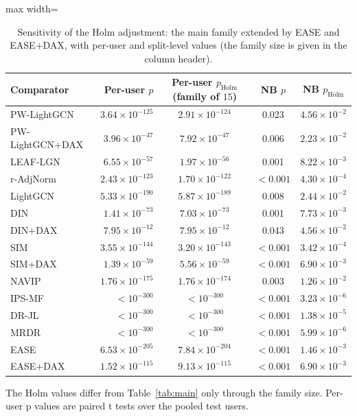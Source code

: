 \documentclass[preprint,12pt,authoryear]{elsarticle}
\begin{document}
\begin{table}[tbp]
\centering
\footnotesize
\caption{Sensitivity of the Holm adjustment: the main family extended by EASE and EASE+DAX, with per-user and split-level values (the family size is given in the column header).}
\label{tab:sens}
\begin{adjustbox}{max width=\linewidth}
\begin{tabular}{lrccc}
\toprule
Comparator & Per-user $p$ & Per-user $p_{\mathrm{Holm}}$ (family of $15$) & NB $p$ & NB $p_{\mathrm{Holm}}$ \\
\midrule
PW-LightGCN & $3.64\times10^{-125}$ & $2.91\times10^{-124}$ & 0.023 & $4.56\times10^{-2}$ \\
PW-LightGCN+DAX & $3.96\times10^{-47}$ & $7.92\times10^{-47}$ & 0.006 & $2.23\times10^{-2}$ \\
LEAF-LGN & $6.55\times10^{-57}$ & $1.97\times10^{-56}$ & 0.001 & $8.22\times10^{-3}$ \\
r-AdjNorm & $2.43\times10^{-123}$ & $1.70\times10^{-122}$ & $<0.001$ & $4.30\times10^{-4}$ \\
LightGCN & $5.33\times10^{-190}$ & $5.87\times10^{-189}$ & 0.008 & $2.44\times10^{-2}$ \\
DIN & $1.41\times10^{-73}$ & $7.03\times10^{-73}$ & 0.001 & $7.73\times10^{-3}$ \\
DIN+DAX & $7.95\times10^{-12}$ & $7.95\times10^{-12}$ & 0.043 & $4.56\times10^{-2}$ \\
SIM & $3.55\times10^{-144}$ & $3.20\times10^{-143}$ & $<0.001$ & $3.42\times10^{-4}$ \\
SIM+DAX & $1.39\times10^{-59}$ & $5.56\times10^{-59}$ & $<0.001$ & $6.90\times10^{-3}$ \\
NAVIP & $1.76\times10^{-175}$ & $1.76\times10^{-174}$ & 0.003 & $1.26\times10^{-2}$ \\
IPS-MF & $<10^{-300}$ & $<10^{-300}$ & $<0.001$ & $3.23\times10^{-6}$ \\
DR-JL & $<10^{-300}$ & $<10^{-300}$ & $<0.001$ & $1.38\times10^{-5}$ \\
MRDR & $<10^{-300}$ & $<10^{-300}$ & $<0.001$ & $5.99\times10^{-6}$ \\
EASE & $6.53\times10^{-205}$ & $7.84\times10^{-204}$ & $<0.001$ & $1.46\times10^{-3}$ \\
EASE+DAX & $1.52\times10^{-115}$ & $9.13\times10^{-115}$ & $<0.001$ & $6.90\times10^{-3}$ \\
\bottomrule
\end{tabular}
\end{adjustbox}
\par\smallskip
\begin{minipage}{\linewidth}\raggedright\footnotesize The Holm values differ from Table~\ref{tab:main} only through the family size. Per-user p values are paired t tests over the pooled test users.\end{minipage}
\end{table}
\end{document}
